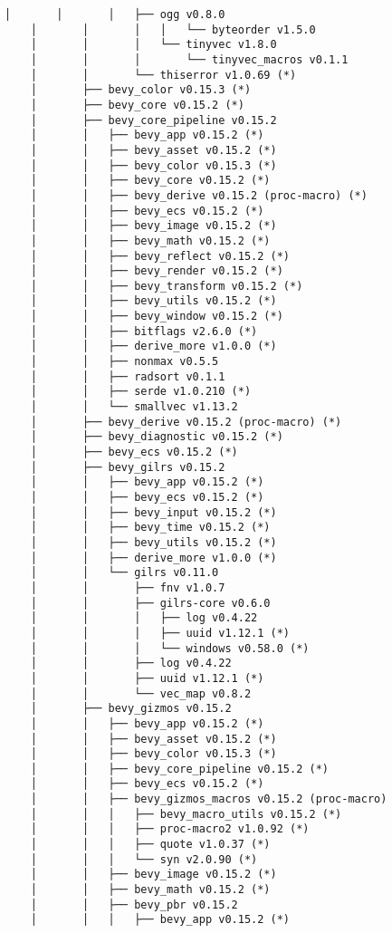 \begin{lstlisting}[style=mystyle, caption={dependencias del proyecto}, label={lst:dependencias}]
    │       │       │   ├── ogg v0.8.0
    │       │       │   │   └── byteorder v1.5.0
    │       │       │   └── tinyvec v1.8.0
    │       │       │       └── tinyvec_macros v0.1.1
    │       │       └── thiserror v1.0.69 (*)
    │       ├── bevy_color v0.15.3 (*)
    │       ├── bevy_core v0.15.2 (*)
    │       ├── bevy_core_pipeline v0.15.2
    │       │   ├── bevy_app v0.15.2 (*)
    │       │   ├── bevy_asset v0.15.2 (*)
    │       │   ├── bevy_color v0.15.3 (*)
    │       │   ├── bevy_core v0.15.2 (*)
    │       │   ├── bevy_derive v0.15.2 (proc-macro) (*)
    │       │   ├── bevy_ecs v0.15.2 (*)
    │       │   ├── bevy_image v0.15.2 (*)
    │       │   ├── bevy_math v0.15.2 (*)
    │       │   ├── bevy_reflect v0.15.2 (*)
    │       │   ├── bevy_render v0.15.2 (*)
    │       │   ├── bevy_transform v0.15.2 (*)
    │       │   ├── bevy_utils v0.15.2 (*)
    │       │   ├── bevy_window v0.15.2 (*)
    │       │   ├── bitflags v2.6.0 (*)
    │       │   ├── derive_more v1.0.0 (*)
    │       │   ├── nonmax v0.5.5
    │       │   ├── radsort v0.1.1
    │       │   ├── serde v1.0.210 (*)
    │       │   └── smallvec v1.13.2
    │       ├── bevy_derive v0.15.2 (proc-macro) (*)
    │       ├── bevy_diagnostic v0.15.2 (*)
    │       ├── bevy_ecs v0.15.2 (*)
    │       ├── bevy_gilrs v0.15.2
    │       │   ├── bevy_app v0.15.2 (*)
    │       │   ├── bevy_ecs v0.15.2 (*)
    │       │   ├── bevy_input v0.15.2 (*)
    │       │   ├── bevy_time v0.15.2 (*)
    │       │   ├── bevy_utils v0.15.2 (*)
    │       │   ├── derive_more v1.0.0 (*)
    │       │   └── gilrs v0.11.0
    │       │       ├── fnv v1.0.7
    │       │       ├── gilrs-core v0.6.0
    │       │       │   ├── log v0.4.22
    │       │       │   ├── uuid v1.12.1 (*)
    │       │       │   └── windows v0.58.0 (*)
    │       │       ├── log v0.4.22
    │       │       ├── uuid v1.12.1 (*)
    │       │       └── vec_map v0.8.2
    │       ├── bevy_gizmos v0.15.2
    │       │   ├── bevy_app v0.15.2 (*)
    │       │   ├── bevy_asset v0.15.2 (*)
    │       │   ├── bevy_color v0.15.3 (*)
    │       │   ├── bevy_core_pipeline v0.15.2 (*)
    │       │   ├── bevy_ecs v0.15.2 (*)
    │       │   ├── bevy_gizmos_macros v0.15.2 (proc-macro)
    │       │   │   ├── bevy_macro_utils v0.15.2 (*)
    │       │   │   ├── proc-macro2 v1.0.92 (*)
    │       │   │   ├── quote v1.0.37 (*)
    │       │   │   └── syn v2.0.90 (*)
    │       │   ├── bevy_image v0.15.2 (*)
    │       │   ├── bevy_math v0.15.2 (*)
    │       │   ├── bevy_pbr v0.15.2
    │       │   │   ├── bevy_app v0.15.2 (*)

\end{lstlisting}
